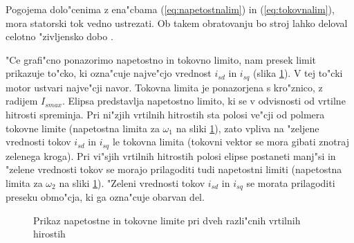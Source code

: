 \documentclass[journal,a4paper,twoside]{sty/IEEEtran}
\begin{document}
Pogojema dolo"cenima z ena"cbama (\ref{eq:napetostnalim}) in (\ref{eq:tokovnalim}), mora statorski tok vedno ustrezati. Ob takem obratovanju bo stroj lahko deloval celotno "zivljensko dobo \cite{vas}.

"Ce grafi"cno ponazorimo napetostno in tokovno limito, nam presek limit prikazuje to"cko, ki ozna"cuje najve"cjo vrednost $i_{sd}$ in $i_{sq}$ (slika \ref{fig:napetostna_tokovna_limita_slika}). V tej to"cki motor ustvari najve"cji navor. Tokovna limita je ponazorjena s kro"znico, z radijem $I_{smax}$. Elipsa predstavlja napetostno limito, ki se v odvisnosti od vrtilne hitrosti spreminja. Pri ni"zjih vrtilnih hitrostih sta polosi ve"cji od polmera tokovne limite (napetostna limita za $\omega_1$ na sliki \ref{fig:napetostna_tokovna_limita_slika}), zato vpliva na "zeljene vrednosti tokov $i_{sd}$ in $i_{sq}$ le tokovna limita (tokovni vektor se mora gibati znotraj zelenega kroga). Pri vi"sjih vrtilnih hitrostih polosi elipse postaneti manj"si in "zelene vrednosti tokov se morajo prilagoditi tudi napetostni limiti (napetostna limita za $\omega_2$ na sliki \ref{fig:napetostna_tokovna_limita_slika}). "Zeleni vrednosti tokov $i_{sd}$ in $i_{sq}$ se morata prilagoditi preseku obmo"cja, ki ga ozna"cuje obarvan del. 

\begin{figure}
\caption{Prikaz napetostne in tokovne limite pri dveh razli"cnih vrtilnih hirostih}
\label{fig:napetostna_tokovna_limita_slika}
\end{figure}
\end{document}
